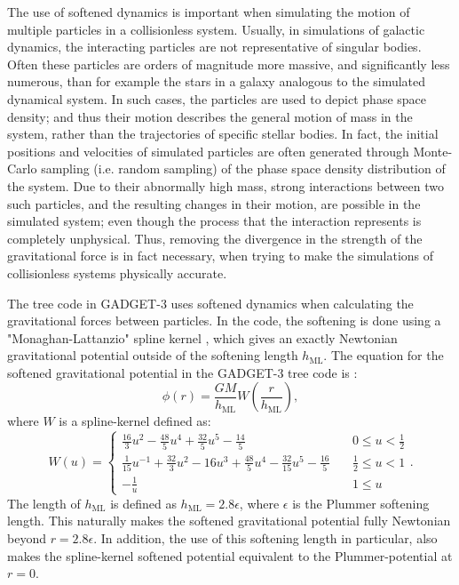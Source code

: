 \documentclass[english, twoside]{HYgradu}
\begin{document}
The use of softened dynamics is important when simulating the motion of multiple particles in a collisionless system. Usually, in simulations of galactic dynamics, the interacting particles are not representative of singular bodies. Often these particles are orders of magnitude more massive, and significantly less numerous, than for example the stars in a galaxy analogous to the simulated dynamical system. In such cases, the particles are used to depict phase space density; and thus their motion describes the general motion of mass in the system, rather than the trajectories of specific stellar bodies. In fact, the initial positions and velocities of simulated particles are often generated through Monte-Carlo sampling (i.e. random sampling) of the phase space density distribution of the system. Due to their abnormally high mass, strong interactions between two such particles, and the resulting changes in their motion, are possible in the simulated system; even though the process that the interaction represents is completely unphysical. Thus, removing the divergence in the strength of the gravitational force is in fact necessary, when trying to make the simulations of collisionless systems physically accurate.

The tree code in GADGET-3 uses softened dynamics when calculating the gravitational forces between particles. In the code, the softening is done using a "Monaghan-Lattanzio" spline kernel \citep{Monaghan1985}, which gives an exactly Newtonian gravitational potential outside of the softening length $h_\mathrm{ML}$. The equation for the softened gravitational potential in the GADGET-3 tree code is \citep{Springel2001}:
\begin{equation}
\phi(r) = \frac{GM}{h_\mathrm{ML}} W \left(\frac{r}{h_\mathrm{ML}} \right), \label{eq:splinekernel_softened_potential}
\end{equation}
where $W$ is a spline-kernel defined as:
\begin{equation}
W(u) = 
\begin{cases}
\frac{16}{3}u^2 - \frac{48}{5} u^4 + \frac{32}{5} u^5 - \frac{14}{5} &\quad 0 \leq u < \frac{1}{2} \\
\frac{1}{15}u^{-1} + \frac{32}{3}u^2 - 16u^3 + \frac{48}{5} u^4 - \frac{32}{15} u^5 - \frac{16}{5} &\quad \frac{1}{2} \leq u < 1 \\
-\frac{1}{u} &\quad  1 \leq u
\end{cases}.
\end{equation} 
The length of $h_\mathrm{ML}$ is defined as $h_\mathrm{ML} = 2.8\epsilon$, where $\epsilon$ is the Plummer softening length. This naturally makes the softened gravitational potential fully Newtonian beyond $r = 2.8 \epsilon$. In addition, the use of this softening length in particular, also makes the spline-kernel softened potential equivalent to the Plummer-potential at $r = 0$.
\end{document}
